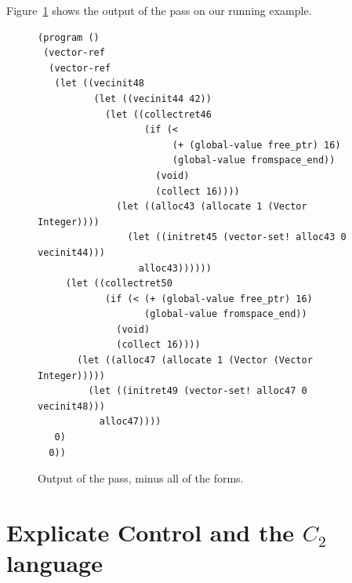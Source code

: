 \documentclass[11pt]{book}
\begin{document}
Figure~\ref{fig:expose-alloc-output} shows the output of the
 pass on our running example.

\begin{figure}[tbp]
\begin{lstlisting}
(program ()
 (vector-ref
  (vector-ref
   (let ((vecinit48
          (let ((vecinit44 42))
            (let ((collectret46
                   (if (<
                        (+ (global-value free_ptr) 16)
                        (global-value fromspace_end))
                     (void)
                     (collect 16))))
              (let ((alloc43 (allocate 1 (Vector Integer))))
                (let ((initret45 (vector-set! alloc43 0 vecinit44)))
                  alloc43))))))
     (let ((collectret50
            (if (< (+ (global-value free_ptr) 16)
                   (global-value fromspace_end))
              (void)
              (collect 16))))
       (let ((alloc47 (allocate 1 (Vector (Vector Integer)))))
         (let ((initret49 (vector-set! alloc47 0 vecinit48)))
           alloc47))))
   0)
  0))
\end{lstlisting}
\caption{Output of the  pass, minus
  all of the  forms.}
\label{fig:expose-alloc-output}
\end{figure}



\section{Explicate Control and the $C_2$ language}
\label{sec:explicate-control-r3}
\end{document}
